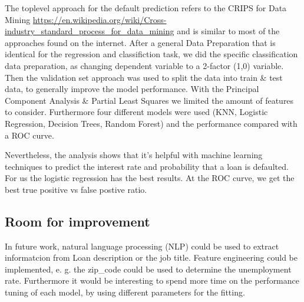 \documentclass[]{article}
\begin{document}
The toplevel approach for the default prediction refers to the CRIPS for
Data Mining
\url{https://en.wikipedia.org/wiki/Cross-industry_standard_process_for_data_mining}
and is similar to most of the approaches found on the internet. After a
general Data Preparation that is identical for the regression and
classifiction task, we did the specific classification data preparation,
as changing dependent variable to a 2-factor (1,0) variable. Then the
validation set approach was used to split the data into train \& test
data, to generally improve the model performance. With the Principal
Component Analysis \& Partial Least Squares we limited the amount of
features to consider. Furthermore four different models were used (KNN,
Logistic Regression, Decision Trees, Random Forest) and the performance
compared with a ROC curve.

Nevertheless, the analysis shows that it's helpful with machine learning
techniques to predict the interest rate and probability that a loan is
defaulted. For us the logistic regression has the best results. At the
ROC curve, we get the best true positive vs false postive ratio.

\hypertarget{room-for-improvement}{%
\subsection{Room for improvement}\label{room-for-improvement}}

In future work, natural language processing (NLP) could be used to
extract informatcion from Loan description or the job title. Feature
engineering could be implemented, e. g. the zip\_code could be used to
determine the unemployment rate. Furthermore it would be interesting to
spend more time on the performance tuning of each model, by using
different parameters for the fitting.
\end{document}
